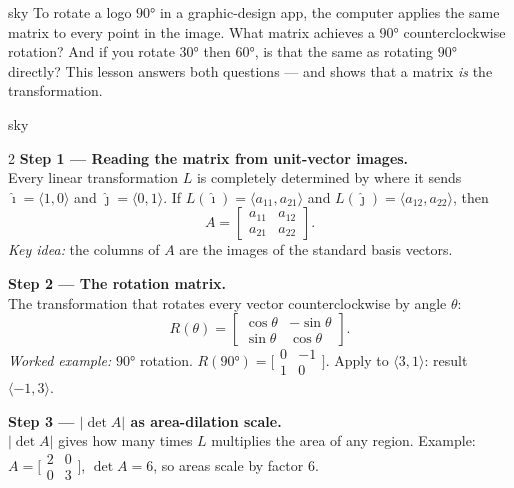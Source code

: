 \documentclass[10pt]{article}
\begin{document}
\begin{skillbox}[Hook]{sky}
To rotate a logo $90°$ in a graphic-design app, the computer applies the same matrix to every
point in the image. What matrix achieves a $90°$ counterclockwise rotation?
And if you rotate $30°$ then $60°$, is that the same as rotating $90°$ directly?
This lesson answers both questions --- and shows that a matrix \emph{is} the transformation.
\end{skillbox}

\begin{skillbox}{sky}
\begin{multicols}{2}
\textbf{Step 1 --- Reading the matrix from unit-vector images.}\\
Every linear transformation $L$ is completely determined by where it sends
$\hat{\imath}=\langle1,0\rangle$ and $\hat{\jmath}=\langle0,1\rangle$.
If $L(\hat{\imath})=\langle a_{11},a_{21}\rangle$ and $L(\hat{\jmath})=\langle a_{12},a_{22}\rangle$, then
\[A = \begin{bmatrix}a_{11}&a_{12}\\a_{21}&a_{22}\end{bmatrix}.\]
\textit{Key idea:} the columns of $A$ are the images of the standard basis vectors.

\columnbreak

\textbf{Step 2 --- The rotation matrix.}\\
The transformation that rotates every vector counterclockwise by angle $\theta$:
\[R(\theta)=\begin{bmatrix}\cos\theta&-\sin\theta\\\sin\theta&\cos\theta\end{bmatrix}.\]
\textit{Worked example:} $90°$ rotation.
$R(90°)=\bigl[\begin{smallmatrix}0&-1\\1&0\end{smallmatrix}\bigr]$.
Apply to $\langle3,1\rangle$: result $\langle-1,3\rangle$.

\textbf{Step 3 --- $|\det A|$ as area-dilation scale.}\\
$|\det A|$ gives how many times $L$ multiplies the area of any region.
Example: $A=\bigl[\begin{smallmatrix}2&0\\0&3\end{smallmatrix}\bigr]$,
$\det A=6$, so areas scale by factor 6.
\end{multicols}
\end{skillbox}
\end{document}
